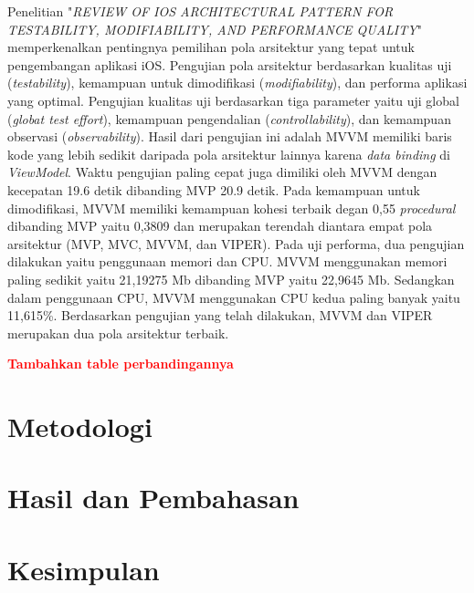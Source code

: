 \documentclass[conference]{IEEEtran}
\begin{document}
    Penelitian "\textit{REVIEW OF IOS ARCHITECTURAL PATTERN FOR
    TESTABILITY, MODIFIABILITY, AND PERFORMANCE QUALITY}" \cite{fz2019} memperkenalkan pentingnya pemilihan pola arsitektur yang tepat untuk pengembangan aplikasi iOS. Pengujian pola arsitektur berdasarkan kualitas uji (\textit{testability}), kemampuan untuk dimodifikasi (\textit{modifiability}), dan performa aplikasi yang optimal. Pengujian kualitas uji berdasarkan tiga parameter yaitu uji global (\textit{globat test effort}), kemampuan pengendalian (\textit{controllability}), dan kemampuan observasi (\textit{observability}). Hasil dari pengujian ini adalah MVVM memiliki baris kode yang lebih sedikit daripada pola arsitektur lainnya karena \textit{data binding} di \textit{ViewModel}. Waktu pengujian paling cepat juga dimiliki oleh MVVM dengan kecepatan 19.6 detik dibanding MVP 20.9 detik. Pada kemampuan untuk dimodifikasi, MVVM memiliki kemampuan kohesi terbaik degan 0,55 \textit{procedural} dibanding MVP yaitu 0,3809 dan merupakan terendah diantara empat pola arsitektur (MVP, MVC, MVVM, dan VIPER). Pada uji performa, dua pengujian dilakukan yaitu penggunaan memori dan CPU. MVVM menggunakan memori paling sedikit yaitu 21,19275 Mb dibanding MVP yaitu 22,9645 Mb. Sedangkan dalam penggunaan CPU, MVVM menggunakan CPU kedua paling banyak yaitu 11,615\%. Berdasarkan pengujian yang telah dilakukan, MVVM dan VIPER merupakan dua pola arsitektur terbaik.
    
    \textbf{\textcolor{red}{Tambahkan table perbandingannya}}
	
	\section{Metodologi}

	
	\section{Hasil dan Pembahasan}

	
	\section{Kesimpulan}
	

\end{document}
